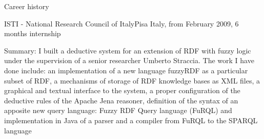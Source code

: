 \documentclass{resume}
\begin{document}
\begin{rSection}{Career history}
    \begin{rSubsection}{ISTI - National Research Council of Italy}{Pisa Italy, from February 2009, 6 months internship}{}{}
      \item[Summary: ]
	I built a deductive system for an extension of RDF with fuzzy logic under the supervision of a senior researcher Umberto Straccia.
	The work I have done include:
	an implementation of a new language fuzzyRDF as a particular subset of RDF,
        a mechanisms of storage of RDF knowledge bases as XML files,
        a graphical and textual interface to the system,
	a proper configuration of the deductive rules of the Apache Jena reasoner,
        definition of the syntax of an apposite new query language: Fuzzy RDF Query language (FuRQL)
	and implementation in Java of a parser and a compiler from FuRQL to the SPARQL language \\ 
    \end{rSubsection}
  \end{rSection}
\end{document}
